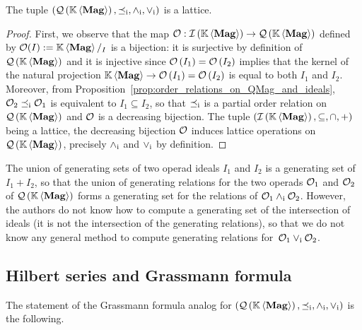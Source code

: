 \begin{Theorem} \label{thm:lattice_structure_of_QMag}
    The tuple $\LatQMag$ is a lattice.
\end{Theorem}
\begin{proof}
    First, we observe that the map $\Oca:\IMag\to\QMag$ defined by
    $\Oca(I) := \KMag/_I$ is a bijection: it is surjective by definition
    of $\QMag$ and it is injective since
    \begin{math}
        \Oca\left(I_1\right) = \Oca\left(I_2\right)
    \end{math}
    implies that the kernel of the natural projection
    \begin{math}
        \KMag\to\Oca\left(I_1\right) = \Oca\left(I_2\right)
    \end{math}
    is equal to both $I_1$ and $I_2$. Moreover, from
    Proposition~\ref{prop:order_relations_on_QMag_and_ideals},
    $\Oca_2\OrdQMag\Oca_1$ is equivalent to $I_1\subseteq I_2$, so that
    $\OrdQMag$ is a partial order relation on $\QMag$ and $\Oca$ is a
    decreasing bijection. The tuple
    $\left(\IMag,\subseteq,\cap,+\right)$ being a lattice, the
    decreasing bijection $\Oca$ induces lattice operations on $\QMag$,
    precisely $\InfQMag$ and $\SupQMag$ by definition.
\end{proof}
\medbreak

The union of generating sets of two operad ideals $I_1$ and $I_2$
is a generating set of $I_1+I_2$, so that the union of generating
relations for the two operads $\Oca_1$ and $\Oca_2$ of $\QMag$ forms a
generating set for the relations of $\Oca_1\InfQMag\Oca_2$. However, the
authors do not know how to compute a generating set of the intersection
of ideals (it is not the intersection of the generating relations), so
that we do not know any general method to compute generating relations
for~$\Oca_1\SupQMag\Oca_2$.
\medbreak

\subsection{Hilbert series and Grassmann formula}
The statement of the Grassmann formula analog for $\LatQMag$ is the
following.
\medbreak


